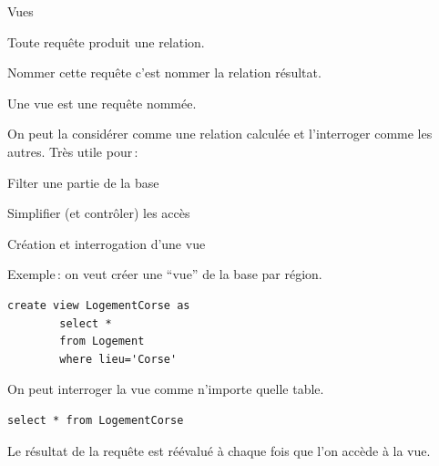 
\begin{frame}[fragile]{Vues}

Toute requête produit une relation.

\vfill

Nommer cette requête c'est nommer la relation résultat.

\vfill

\alert{Une vue est une requête nommée}.

\vfill

On peut la considérer comme une relation \alert{calculée}
et l'interroger comme les autres. Très utile pour\,:

\vfill

\begin{redbullet}
   \item Filter une partie de la base
   \item Simplifier (et contrôler) les accès 
\end{redbullet}
\end{frame}


\begin{frame}[fragile]{Création et interrogation d'une vue}

Exemple\,: on veut créer une ``vue''  de la base par région.

\vfill

\begin{verbatim}
create view LogementCorse as 
        select *
        from Logement 
        where lieu='Corse'
\end{verbatim}

\vfill

On peut interroger la vue comme n'importe quelle table.

\vfill

\begin{verbatim}
select * from LogementCorse
\end{verbatim}

\vfill

Le résultat de la requête
est réévalué à chaque fois que l'on accède à la vue. 

\end{frame}


